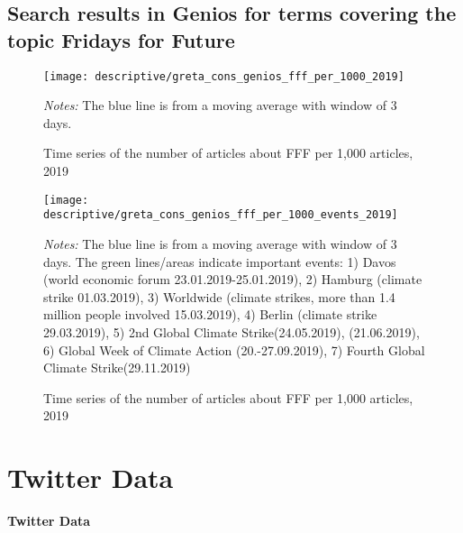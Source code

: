 \documentclass[11pt, a4paper]{article} %
\begin{document}
\newpage
\subsection{Search results in Genios for terms covering the topic Fridays for Future}


\begin{figure}[H]\centering
	\caption{Time series of the number of articles about FFF per 1,000 articles, 2019}
	\texttt{[image: descriptive/greta\_cons\_genios\_fff\_per\_1000\_2019]}
	\begin{minipage}{\linewidth}
		\scriptsize{\emph{Notes:} The blue line is from a moving average with window of 3 days.}
	\end{minipage}
\end{figure}


\begin{figure}[H]\centering
	\caption{Time series of the number of articles about FFF per 1,000 articles, 2019}
	\texttt{[image: descriptive/greta\_cons\_genios\_fff\_per\_1000\_events\_2019]}
	\begin{minipage}{\linewidth}
		\scriptsize{\emph{Notes:} The blue line is from a moving average with window of 3 days. The green lines/areas indicate important events: 1) Davos (world economic forum 23.01.2019-25.01.2019), 2) Hamburg (climate strike 01.03.2019), 3) Worldwide (climate strikes, more than 1.4 million people involved 15.03.2019), 4) Berlin (climate strike 29.03.2019), 5) 2nd Global Climate Strike(24.05.2019), (21.06.2019), 6) Global Week of Climate Action (20.-27.09.2019), 7) Fourth Global Climate Strike(29.11.2019)}
	\end{minipage}
\end{figure}



\newpage
\TODO\section{Twitter Data}
\vspace*{\fill}
{\Huge \begin{center}\textbf{Twitter Data}\end{center}}
\vspace*{\fill}\clearpage
\end{document}
